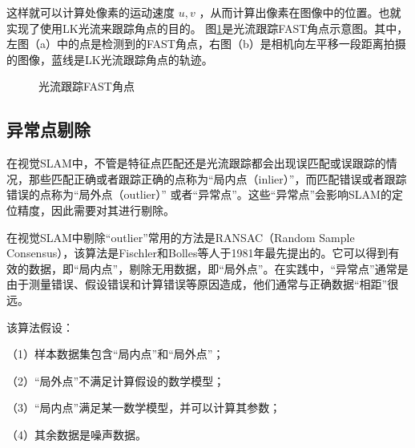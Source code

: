 这样就可以计算处像素的运动速度 $u,v$ ，从而计算出像素在图像中的位置。也就实现了使用LK光流来跟踪角点的目的。
图\ref{fig3_4}是光流跟踪FAST角点示意图。其中，左图（a）中的点是检测到的FAST角点，右图（b）是相机向左平移一段距离拍摄的图像，蓝线是LK光流跟踪角点的轨迹。
\begin{figure}[h]\setlength{\belowcaptionskip}{-12pt}
	\centering
	\caption{光流跟踪FAST角点}\label{fig3_4}
\end{figure}
\subsection{异常点剔除}
在视觉SLAM中，不管是特征点匹配还是光流跟踪都会出现误匹配或误跟踪的情况，那些匹配正确或者跟踪正确的点称为“局内点（inlier）”，而匹配错误或者跟踪错误的点称为“局外点（outlier）” 或者“异常点”。这些“异常点”会影响SLAM的定位精度，因此需要对其进行剔除。

在视觉SLAM中剔除“outlier”常用的方法是RANSAC（Random Sample Consensus），该算法是Fischler和Bolles等人于1981年最先提出的。它可以得到有效的数据，即“局内点”，剔除无用数据，即“局外点”。在实践中，“异常点”通常是由于测量错误、假设错误和计算错误等原因造成，他们通常与正确数据“相距”很远。

该算法假设：

（1）样本数据集包含“局内点”和“局外点”；

（2）“局外点”不满足计算假设的数学模型；

（3）“局内点”满足某一数学模型，并可以计算其参数；

（4）其余数据是噪声数据。


